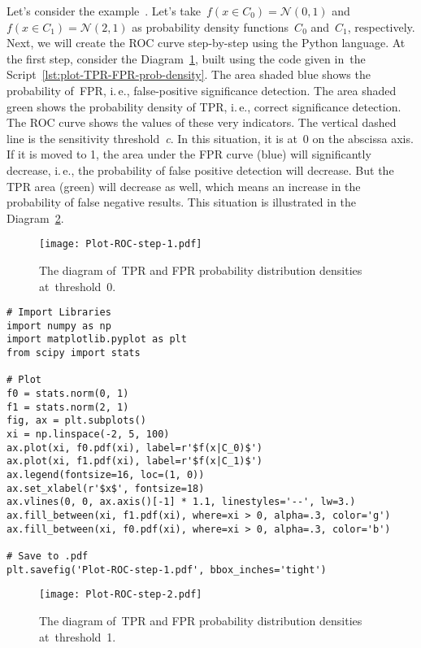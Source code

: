 \documentclass[]{scrreprt}
\begin{document}
Let's consider the example~\cite{AUC-Derivation}. Let's take~$f(x\in C_{0}) = \mathcal{N}(0,1)$ and~$f(x\in C_{1}) = \mathcal{N}(2,1)$ as probability density functions~$C_{0}$ and~$C_{1}$, respectively. Next, we will create the ROC curve step-by-step using the Python language. At the first step, consider the Diagram~\ref{fig:plot-TPR-FPR-prob-density-1}, built using the code given in~the Script~\ref{lst:plot-TPR-FPR-prob-density}. The area shaded blue shows the probability of~FPR, i.\,e., false-positive significance detection. The area shaded green shows the probability density of TPR, i.\,e., correct significance detection. The ROC curve shows the values of these very indicators. The vertical dashed line is the sensitivity threshold~\textit{c}. In this situation, it is at~0 on the abscissa axis. If it is moved to 1, the area under the FPR curve (blue) will significantly decrease, i.\,e., the probability of false positive detection will decrease. But the TPR area (green) will decrease as well, which means an increase in the probability of false negative results. This situation is illustrated in the Diagram~\ref{fig:plot-TPR-FPR-prob-density-2}.
%
\begin{figure}[htp]
	\centering
	\texttt{[image: Plot-ROC-step-1.pdf]}
	\caption{The diagram of~TPR and FPR probability distribution densities at~threshold~0.}
	\label{fig:plot-TPR-FPR-prob-density-1}
\end{figure}
%
\begin{lstlisting}[float=htp, caption = Plotting TPR and FPR probability density functions, firstnumber=1, label= lst:plot-TPR-FPR-prob-density]
# Import Libraries
import numpy as np
import matplotlib.pyplot as plt
from scipy import stats

# Plot
f0 = stats.norm(0, 1)
f1 = stats.norm(2, 1)
fig, ax = plt.subplots()
xi = np.linspace(-2, 5, 100)
ax.plot(xi, f0.pdf(xi), label=r'$f(x|C_0)$')
ax.plot(xi, f1.pdf(xi), label=r'$f(x|C_1)$')
ax.legend(fontsize=16, loc=(1, 0))
ax.set_xlabel(r'$x$', fontsize=18)
ax.vlines(0, 0, ax.axis()[-1] * 1.1, linestyles='--', lw=3.)
ax.fill_between(xi, f1.pdf(xi), where=xi > 0, alpha=.3, color='g')
ax.fill_between(xi, f0.pdf(xi), where=xi > 0, alpha=.3, color='b')

# Save to .pdf
plt.savefig('Plot-ROC-step-1.pdf', bbox_inches='tight')

\end{lstlisting}
%
\begin{figure}[htp]
	\centering
	\texttt{[image: Plot-ROC-step-2.pdf]}
	\caption{The diagram of~TPR and FPR probability distribution densities at~threshold~1.}
	\label{fig:plot-TPR-FPR-prob-density-2}
\end{figure}
\end{document}

